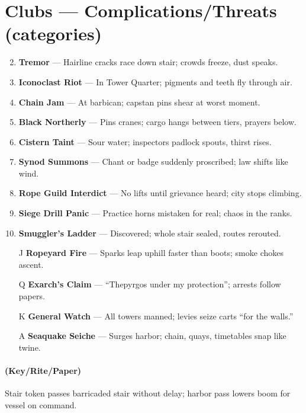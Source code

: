 \section*{Clubs --- Complications/Threats (categories)}
\label{sec:thepyrgos-complications}
\begin{enumerate}
\setcounter{enumi}{1}
\item \textbf{Tremor} --- Hairline cracks race down stair; crowds freeze, dust speaks.
\item \textbf{Iconoclast Riot} --- In Tower Quarter; pigments and teeth fly through air.
\item \textbf{Chain Jam} --- At barbican; capstan pins shear at worst moment.
\item \textbf{Black Northerly} --- Pins cranes; cargo hangs between tiers, prayers below.
\item \textbf{Cistern Taint} --- Sour water; inspectors padlock spouts, thirst rises.
\item \textbf{Synod Summons} --- Chant or badge suddenly proscribed; law shifts like wind.
\item \textbf{Rope Guild Interdict} --- No lifts until grievance heard; city stops climbing.
\item \textbf{Siege Drill Panic} --- Practice horns mistaken for real; chaos in the ranks.
\item \textbf{Smuggler's Ladder} --- Discovered; whole stair sealed, routes rerouted.
\item[J] \textbf{Ropeyard Fire} --- Sparks leap uphill faster than boots; smoke chokes ascent.
\item[Q] \textbf{Exarch's Claim} --- ``Thepyrgos under my protection''; arrests follow papers.
\item[K] \textbf{General Watch} --- All towers manned; levies seize carts ``for the walls.''
\item[A] \textbf{Seaquake Seiche} --- Surges harbor; chain, quays, timetables snap like twine.
\end{enumerate}

\paragraph*{(Key/Rite/Paper)} Stair token passes barricaded stair without delay; harbor pass lowers boom for vessel on command.

